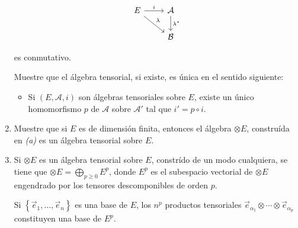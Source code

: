 \documentclass[../variedades_diferenciables_I.tex]{subfiles}
\begin{document}
\begin{excer}[Ejercicio 19]
\begin{enumerate}[label = \textit{(\alph*)}]
\begin{mydef}
                \[
                \begin{tikzcd}
                    E \arrow[r, "i"] \arrow[dr,"\lambda"] 
                    & \mathcal{A} \arrow[d,"\lambda^*"] \\
                    & \mathcal{B}
                \end{tikzcd}
                \]
    
                es conmutativo.
            \end{mydef}

            Muestre que el álgebra tensorial, si existe, es única en el sentido siguiente:

            \begin{itemize}
                \item Si $\left(E,\mathcal{A},i\right)$ son álgebras tensoriales sobre $E$, existe un único homomorfismo $p$ de $\mathcal{A}$ sobre $\mathcal{A}'$ tal que $i'=p\circ i$.
            \end{itemize}

            \item Muestre que si $E$ es de dimensión finita, entonces el álgebra $\otimes E$, construída en \textit{(a)} es un álgebra tensorial sobre $E$.
            \item Si $\otimes E$ es un álgebra tensorial sobre $E$, constrído de un modo cualquiera, se tiene que $\otimes E=\bigoplus_{ p\geq0}E^p$, donde $E^p$ es el subespacio vectorial de $\otimes E$ engendrado por los tensores descomponibles de orden $p$.
            
            Si $\left\{\vec{e}_1,\dots,\vec{e}_n \right\}$ es una base de $E$, los $n^p$ productos tensoriales $\vec{e}_{\alpha_1}\otimes\cdots\otimes\vec{e}_{\alpha_p}$ constituyen una base de $E^p$.
        \end{enumerate}
    \end{excer}
\end{document}
